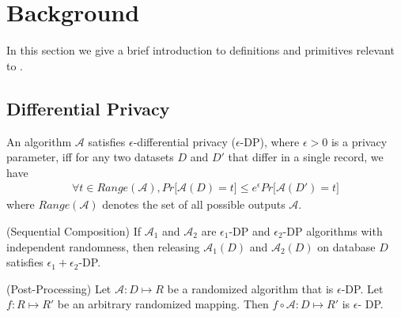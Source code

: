 
\section{Background}\label{sec:background}
In this section we give a brief introduction to definitions and primitives relevant to \system. 

\subsection{Differential Privacy}
\begin{definition} \label{def:dp}
An algorithm $\mathcal{A}$
satisfies $\epsilon$-differential privacy ($\epsilon$-DP), where $\epsilon > 0$ is a privacy parameter, iff
 for any two datasets $D$ and $D'$ that differ in a single record, we have
\begin{gather}
\forall t \in Range(\mathcal{A}), Pr \big[\mathcal{A}(D) = t\big] \leq e^{\epsilon}Pr\big[\mathcal{A}(D') = t\big]
\end{gather}
where $Range(\mathcal{A})$ denotes the set of all possible outputs
$\mathcal{A}$.
\end{definition} 
\begin{theorem}(Sequential Composition) \label{theorem:seq}
If $\mathcal{A}_1$ and
$\mathcal{A}_2$ are $\epsilon_1$-DP and $\epsilon_2$-DP algorithms with independent randomness, then releasing $\mathcal{A}_1(D)$ and
$\mathcal{A}_2(D)$ on database $D$ satisfies $\epsilon_1+\epsilon_2$-DP.\end{theorem} 
\begin{theorem}(Post-Processing)\label{post}
Let $\mathcal{A}: D \mapsto R$ be a randomized
algorithm that is $\epsilon$-DP. Let $f : R \mapsto R'$ be an
arbitrary randomized mapping. Then $f \circ \mathcal{A} : D \mapsto R'$ is $\epsilon$-
DP. \end{theorem}
